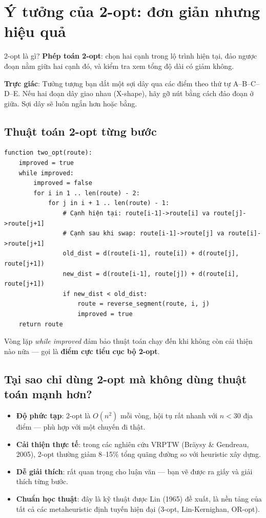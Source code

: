 \documentclass[12pt,a4paper]{report}
\begin{document}
\section{Ý tưởng của 2-opt: đơn giản nhưng hiệu quả}

\begin{ideabox}{2-opt là gì?}
\textbf{Phép toán 2-opt}: chọn hai cạnh trong lộ trình hiện tại, đảo ngược đoạn nằm giữa hai cạnh đó, và kiểm tra xem tổng độ dài có giảm không.

\textbf{Trực giác}: Tưởng tượng bạn dắt một sợi dây qua các điểm theo thứ tự A--B--C--D--E. Nếu hai đoạn dây giao nhau (X-shape), hãy gỡ nút bằng cách đảo đoạn ở giữa. Sợi dây sẽ luôn ngắn hơn hoặc bằng.
\end{ideabox}

\subsection{Thuật toán 2-opt từng bước}

\begin{lstlisting}[style=pseudo, caption={Pseudo-code thuật toán 2-opt}]
function two_opt(route):
    improved = true
    while improved:
        improved = false
        for i in 1 .. len(route) - 2:
            for j in i + 1 .. len(route) - 1:
                # Cạnh hiện tại: route[i-1]->route[i] va route[j]->route[j+1]
                # Cạnh sau khi swap: route[i-1]->route[j] va route[i]->route[j+1]
                old_dist = d(route[i-1], route[i]) + d(route[j], route[j+1])
                new_dist = d(route[i-1], route[j]) + d(route[i], route[j+1])
                if new_dist < old_dist:
                    route = reverse_segment(route, i, j)
                    improved = true
    return route
\end{lstlisting}

Vòng lặp \textit{while improved} đảm bảo thuật toán chạy đến khi không còn cải thiện nào nữa --- gọi là \textbf{điểm cực tiểu cục bộ 2-opt}.

\subsection{Tại sao chỉ dùng 2-opt mà không dùng thuật toán mạnh hơn?}

\begin{itemize}[leftmargin=*]
    \item \textbf{Độ phức tạp}: 2-opt là $O(n^2)$ mỗi vòng, hội tụ rất nhanh với $n < 30$ địa điểm --- phù hợp với một chuyến đi thật.
    \item \textbf{Cải thiện thực tế}: trong các nghiên cứu VRPTW (Bräysy \& Gendreau, 2005), 2-opt thường giảm 8--15\% tổng quãng đường so với heuristic xây dựng.
    \item \textbf{Dễ giải thích}: rất quan trọng cho luận văn --- bạn vẽ được ra giấy và giải thích từng bước.
    \item \textbf{Chuẩn học thuật}: đây là kỹ thuật được Lin (1965) đề xuất, là nền tảng của tất cả các metaheuristic định tuyến hiện đại (3-opt, Lin-Kernighan, OR-opt).
\end{itemize}
\end{document}
